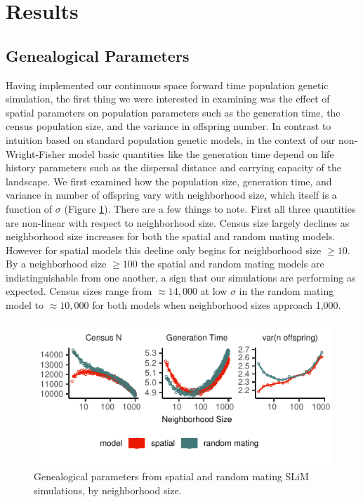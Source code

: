 \documentclass[11pt,twoside,lineno]{preprint}
\begin{document}
\section{Results}

\subsection{Genealogical Parameters}
Having implemented our continuous space forward time population genetic simulation, the first thing we were interested in examining was the effect of spatial parameters on population parameters such as the generation time, the census population size, and the variance in offspring number. In contrast to intuition based on standard population genetic models, in the context of our non-Wright-Fisher model basic quantities like the generation time depend on life history parameters such as the dispersal distance and carrying capacity of the landscape. We first examined how the population size, generation time, and  variance in number of offspring vary with neighborhood size, which itself is a function of $\sigma$ (Figure \ref{fig:genparams}). There are a few things to note. First all three quantities are non-linear with respect to neighborhood size. Census size largely declines as neighborhood size increases for both the spatial and random mating models. However for spatial models this decline only begins for neighborhood size $\geq 10$. By a neighborhood size $\geq 100$ the spatial and random mating models are indistinguishable from one another, a sign that our simulations are performing as expected. Census sizes range from $\approx 14,000$ at low $\sigma$ in the random mating model to $\approx 10,000$ for both models when neighborhood sizes approach 1,000.

\begin{figure}[htbp]
\centering
\includegraphics{figures/pop_params.pdf}
\caption{Genealogical parameters from spatial and random mating SLiM simulations, by neighborhood size.}
\label{fig:genparams}
\end{figure}
\end{document}

